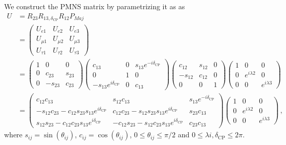 We construct the PMNS matrix by parametrizing it as as
\begin{align}\label{PMNS_def}
    U &= R_{23}R_{13,\delta_{\text{CP}}}R_{12}P_{Maj} \nonumber \\
     &= \begin{pmatrix}
        U_{e 1} & U_{e2} & U_{e3} \\
         U_{\mu 1} & U_{\mu 2} & U_{\mu 3} \\
         U_{\tau 1} & U_{\tau 2} & U_{\tau 3}
      \end{pmatrix} \nonumber \\
      & = \begin{pmatrix}1 & 0 & 0 \\ 0 & c_{23} & s_{23} \\ 0 & -s_{23} & c_{23}\end{pmatrix}
\begin{pmatrix}c_{13} & 0 & s_{13} e^{-i \delta_{\mathrm{CP}}} \\ 0 & 1 & 0 \\ -s_{13} e^{i \delta_{\mathrm{CP}}} & 0 & c_{13}\end{pmatrix}
\begin{pmatrix}c_{12} & s_{12} & 0 \\ -s_{12} & c_{12} & 0 \\ 0 & 0 & 1\end{pmatrix}
\begin{pmatrix}1 & 0 & 0 \\ 0 & e^{i \lambda{2}} & 0 \\ 0 & 0 & e^{i \lambda{3}}\end{pmatrix}
\nonumber \\
 &=\begin{pmatrix}c_{12} c_{13} & s_{12} c_{13} & s_{13} e^{-i \delta_{\mathrm{CP}}} \\ 
        -s_{12} c_{23}-c_{12} s_{23} s_{13}e^{i \delta_{\mathrm{CP}}} & c_{12} c_{23}-s_{12} s_{23} s_{13}e^{i \delta_{\mathrm{CP}}} & s_{23} c_{13} \\ 
        s_{12} s_{23}-c_{12} c_{23} s_{13}e^{i \delta_{\mathrm{CP}}}  & -c_{12} s_{23}-s_{12} c_{23} s_{13}e^{i \delta_{\mathrm{CP}}} & c_{23} c_{13}
    \end{pmatrix}
    \begin{pmatrix}1 & 0 & 0 \\ 0 & e^{i \lambda{2}} & 0 \\ 0 & 0 & e^{i \lambda{3}}\end{pmatrix}\,,
\end{align}
where $s_{ij} = \sin(\theta_{ij})$, $c_{ij} = \cos(\theta_{ij})$, $0 \leq \theta_{ij} \leq \pi/2$ and $ 0 \leq \lambda{i},\delta_\mathrm{CP} \leq 2\pi$. 

